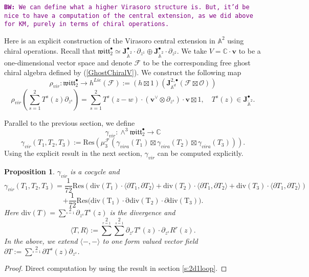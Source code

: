 \documentclass[11pt]{amsart}
\newtheorem{prop}[thm]{Proposition}
\theoremstyle{definition}
\theoremstyle{remark}
\numberwithin{equation}{section}
\def\BW#1{{\textcolor{purple}{{\tt {\bf BW:} #1}}}}
\begin{document}
\BW{We can define what a higher Virasoro structure is. But, it'd be nice to have a computation of the central extension,
as we did above for KM, purely in terms of chiral operations.}

Here is an explicit construction of the Virasoro central extension in $\mathbb{A}^2$ using chiral operations. Recall that $\mathfrak{witt}^{\bullet}_{2}\simeq \mathbf{J}^{\bullet}_{\mathring{\mathbb{A}}^2}\cdot \partial_{z^1}\oplus\mathbf{J}^{\bullet}_{\mathring{\mathbb{A}}^2}\cdot \partial_{z^2}$. We take $V=\mathbb{C}\cdot \mathbf{v}$ to be a one-dimensional vector space and denote $\mathcal{F}$ to be the corresponding free ghost chiral algebra defined by (\ref{GhostChiralV}). We construct the following map
$$
\rho_{vir}:\mathfrak{witt}^{\bullet}_{2}\rightarrow h^{Lie}(\mathcal{F}):=(h\boxtimes 1)\left(\mathbf{J}^{2,\bullet}_{\mathbb{A}^d}(\mathcal{F}\boxtimes \mathcal{O})\right)
$$
$$
\rho_{vir}(\sum^2_{s=1}T^s(z)\partial_{z^s})=\sum^2_{s=1}T^s(z-w)\cdot(\mathbf{v}^{\vee}\otimes \partial_{z^s})\cdot \mathbf{v}\boxtimes 1,\quad T^s(z)\in \mathbf{J}^{\bullet}_{\mathring{\mathbb{A}}^2}.
$$

Parallel to the previous section, we define
$$
\gamma_{vir}:\wedge^3 \mathfrak{witt}^{\bullet}_{2}\rightarrow \mathbb{C}
$$
$$
\gamma_{vir}(T_1,T_2,T_3):=\mathrm{Res}\left(\mu^{\mathcal{F}}_3(\gamma_{vira}(T_1)\boxtimes \gamma_{vira}(T_2)\boxtimes \gamma_{vira}(T_3) )\right).
$$
Using the explicit result in the next section, $\gamma_{vir}$ can be computed explicitly.
\begin{prop}
    $\gamma_{vir}$ is a cocycle and
    $$
    \gamma_{vir}(T_1,T_2,T_3)=\frac{1}{72}\mathrm{Res}(\mathrm{div}(T_1)\cdot \langle\partial T_1,\partial T_2\rangle+\mathrm{div}(T_2)\cdot \langle\partial T_1,\partial T_2\rangle+\mathrm{div}(T_3)\cdot \langle\partial T_1,\partial T_2\rangle)
    $$
    $$
    +\frac{1}{72}\mathrm{Res(\mathrm{div(T_1)}\cdot \partial}\mathrm{div(T_2)}\cdot\partial\mathrm{div(T_3)}).
    $$
    Here $\mathrm{div}(T)=\sum^2\limits_{s=1}\partial_{z^s}T^s(z)$ is the divergence and
    $$
   \langle T,R\rangle:=\sum^2\limits_{r=1}\sum^2\limits_{s=1}\partial_{z^r} T^s(z)\cdot \partial_{z^s}R^r(z).
    $$
    In the above, we extend $\langle-,-\rangle$ to one form valued vector field $\partial T:=\sum^2\limits_{s=1}\partial T^s(z)\partial_{z^s}$.
\end{prop}
\begin{proof}
    Direct computation by using the result in section \ref{s:2d1loop}.
\end{proof}
\end{document}
